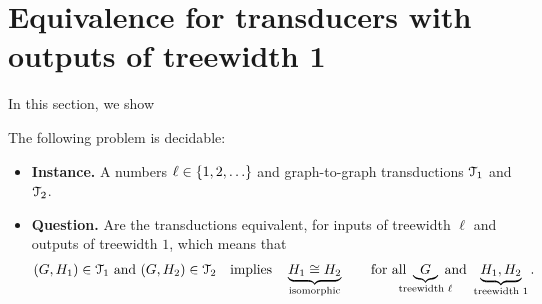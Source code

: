 
\section{Equivalence for transducers with outputs of treewidth 1}
In this section, we show 
\begin{theorem}
    The following problem is decidable:
    \begin{itemize}
        \item {\bf Instance.} A numbers $\ell \in \{1,2,\ldots\}$ and graph-to-graph \mso transductions $\mathcal T_1$ and $\mathcal T_2$.
        \item {\bf Question.} Are the transductions equivalent, for inputs of treewidth $\ell$ and outputs of treewidth $1$, which means that
        \begin{align*}
        (G,H_1) \in \Tt_1 \text{ and } (G,H_2) \in \Tt_2 \quad \text{implies} \quad \myunderbrace{H_1 \cong H_2}{isomorphic}  \qquad \text{for all }\myunderbrace{G}{treewidth $\ell$} \text{ and } \underbrace{H_1,H_2}_{\text{treewidth $1$}}.
        \end{align*}
    \end{itemize}
    
\end{theorem}